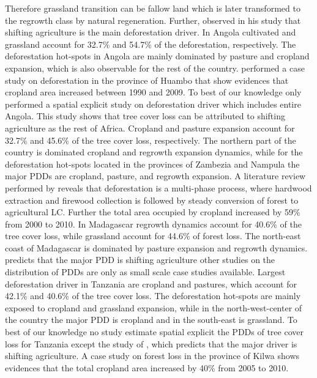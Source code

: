 Therefore grassland transition can be fallow land which is later transformed to the regrowth class by natural regeneration. Further, \citeauthor{Curtis2018} observed in his study that shifting agriculture is the main deforestation driver. In Angola cultivated and grassland account for 32.7\% and 54.7\% of the deforestation, respectively. The deforestation hot-spots in Angola are mainly dominated by pasture and cropland expansion, which is also observable for the rest of the country. \citet{Cabral2011} performed a case study on deforestation in the province of Huambo that show evidences that cropland area increased between 1990 and 2009. To best of our knowledge only \citet{Curtis2018} performed a spatial explicit study on deforestation driver which includes entire Angola. This study shows that tree cover loss can be attributed to shifting agriculture as the rest of Africa. Cropland and pasture expansion account for 32.7\% and 45.6\% of the tree cover loss, respectively. The northern part of the country is dominated cropland and regrowth expansion dynamics, while for the deforestation hot-spots located in the provinces of Zambezia and Nampula the major \acp{PDD} are cropland, pasture, and regrowth expansion. A literature review performed by \citet{Sitoe2012} reveals that deforestation is a multi-phase process, where hardwood extraction and firewood collection is followed by steady conversion of forest to agricultural \ac{LC}. Further the total area occupied by cropland increased by 59\% from 2000 to 2010. In Madagascar regrowth dynamics account for 40.6\% of the tree cover loss, while grassland account for 44.6\% of forest loss. The north-east coast of Madagascar is dominated by pasture expansion and regrowth dynamics. \citet{Curtis2018} predicts that the major \ac{PDD} is shifting agriculture other studies on the distribution of \acp{PDD} are only as small scale case studies available. Largest deforestation driver in Tanzania are cropland and pastures, which account for 42.1\% and 40.6\% of the tree cover loss. The deforestation hot-spots are mainly exposed to cropland and grassland expansion, while in the north-west-center of the country the major \ac{PDD} is cropland and in the south-east is grassland. To best of our knowledge no study estimate spatial explicit the \acp{PDD} of tree cover loss for Tanzania except the study of \citet{Curtis2018}, which predicts that the major driver is shifting agriculture. A case study on forest loss in the province of Kilwa shows evidences that the total cropland area increased by 40\% from 2005 to 2010.
